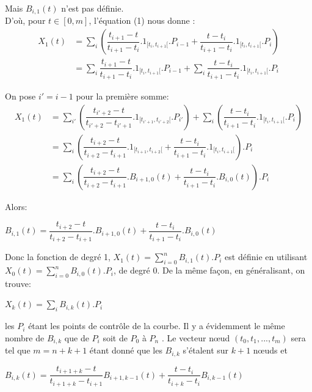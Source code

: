 \documentclass{article}
\begin{document}
Mais $B_{i,1}(t)$ n'est pas d\'efinie. \\

D'o\`u, pour $t\in [0,m]$, l'\'equation (1) nous donne :
\begin{align*} 
X_{1}(t)  & = \sum\limits_{i} (\dfrac{t_{i+1}-t}{t_{i+1}-t_{i}}.1_{[t_{i},t_{i+1}[}.P_{i-1} + \dfrac{t-t_{i}}{t_{i+1}-t_{i}}.1_{[t_{i},t_{i+1}[}.P_{i})
\\[5pt]
& = \sum\limits_{i} \dfrac{t_{i+1}-t}{t_{i+1}-t_{i}}.1_{[t_{i},t_{i+1}[}.P_{i-1}+ \sum\limits_{i} \dfrac{t-t_{i}}{t_{i+1}-t_{i}}.1_{[t_{i},t_{i+1}[}.P_{i}
\end{align*} 

On pose $i' = i-1 $ pour la premi\`ere somme:
\begin{align*}
X_{1}(t) & = \sum\limits_{i'} (\dfrac{t_{i'+2}-t}{t_{i'+2}-t_{i'+1}}.1_{[t_{i'+1},t_{i'+2}[}.P_{i'})+ \sum\limits_{i} (\dfrac{t-t_{i}}{t_{i+1}-t_{i}}.1_{[t_{i},t_{i+1}[}.P_{i})
\\[5pt]
& = \sum\limits_{i} (\dfrac{t_{i+2}-t}{t_{i+2}-t_{i+1}}.1_{[t_{i+1},t_{i+2}[} + \dfrac{t-t_{i}}{t_{i+1}-t_{i}}.1_{[t_{i},t_{i+1}[}).P_{i}
\\[5pt]
& = \sum\limits_{i} (\dfrac{t_{i+2}-t}{t_{i+2}-t_{i+1}}.B_{i+1,0}(t) + \dfrac{t-t_{i}}{t_{i+1}-t_{i}}.B_{i,0}(t)).P_{i}
\end{align*}

Alors:

\begin{center}$B_{i,1}(t) = \dfrac{t_{i+2}-t}{t_{i+2}-t_{i+1}}.B_{i+1,0}(t) + \dfrac{t-t_{i}}{t_{i+1}-t_{i}}.B_{i,0}(t)$
\end{center}


Donc la fonction de degr\'e 1, $X_{1}(t) =\sum\limits_{i=0}^n B_{i,1}(t) . P_{i}$ est d\'efinie en utilisant  $X_{0}(t) =\sum\limits_{i=0}^n B_{i,0}(t) . P_{i}$, de degr\'e 0. De la m\^eme fa\c con, en g\'en\'eralisant, on trouve: 

\begin{center}$X_{k}(t) =\sum\limits_{i} B_{i,k}(t) . P_{i}$ \end{center}

les $P_{i}$ \'etant les points de contr\^ole de la courbe. Il y a \'evidemment le m\^eme nombre de $B_{i,k}$ que de $P_{i}$ soit de $P_{0}$ \`a $P_{n}$ . Le vecteur n\oe ud $(t_{0} , t_{1} , ..., t_{m})$ sera tel que $m=n+k+1$ \'etant donn\'e que les $B_{i,k}$ s'\'etalent sur $k + 1$ n\oe uds et 
 
\begin{center}$B_{i,k}(t)= \dfrac{t_{i+1+k}-t}{t_{i+1+k}-t_{i+1}}B_{i+1,k-1}(t) + \dfrac{t-t_{i}}{t_{i+k}-t_{i}}B_{i,k-1}(t)$ \end{center}
\end{document}
